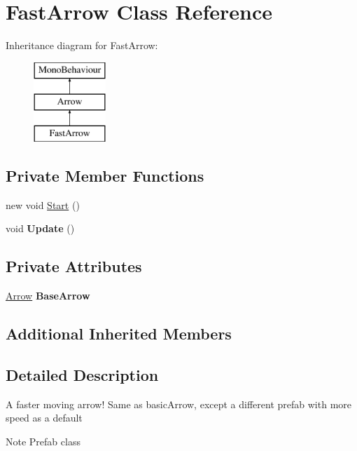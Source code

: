 \hypertarget{class_fast_arrow}{}\section{Fast\+Arrow Class Reference}
\label{class_fast_arrow}
Inheritance diagram for Fast\+Arrow\+:\begin{figure}[H]
\begin{center}
\leavevmode
\includegraphics[height=3.000000cm]{class_fast_arrow}
\end{center}
\end{figure}
\subsection*{Private Member Functions}
\begin{DoxyCompactItemize}
\item 
new void \hyperlink{class_fast_arrow_a112df0c78fbcd99d22fc083c08e785de}{Start} ()
\item 
\mbox{\label{class_fast_arrow_a4821a5e4ca53ebc904663395ee312061}} 
void {\bfseries Update} ()
\end{DoxyCompactItemize}
\subsection*{Private Attributes}
\begin{DoxyCompactItemize}
\item 
\mbox{\label{class_fast_arrow_aca9b777b6e4c2b4c611aec0433c2502d}} 
\hyperlink{class_arrow}{Arrow} {\bfseries Base\+Arrow}
\end{DoxyCompactItemize}
\subsection*{Additional Inherited Members}


\subsection{Detailed Description}
A faster moving arrow! Same as basic\+Arrow, except a different prefab with more speed as a default \begin{DoxyNote}{Note}
Prefab class 
\end{DoxyNote}


